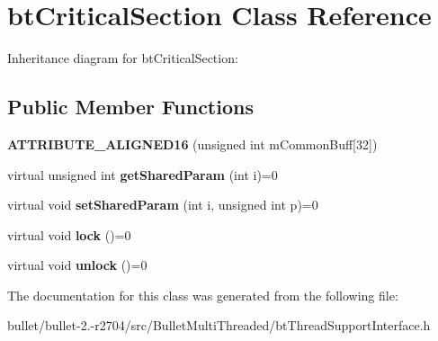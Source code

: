 \hypertarget{classbt_critical_section}{\section{bt\+Critical\+Section Class Reference}
\label{classbt_critical_section}
}


Inheritance diagram for bt\+Critical\+Section\+:
\subsection*{Public Member Functions}
\begin{DoxyCompactItemize}
\item 
\hypertarget{classbt_critical_section_aca4159904f35d55d54fed017a2d2dc0b}{{\bfseries A\+T\+T\+R\+I\+B\+U\+T\+E\+\_\+\+A\+L\+I\+G\+N\+E\+D16} (unsigned int m\+Common\+Buff\mbox{[}32\mbox{]})}\label{classbt_critical_section_aca4159904f35d55d54fed017a2d2dc0b}

\item 
\hypertarget{classbt_critical_section_ad58e34e3eb0fc636edeb69fe17f793ac}{virtual unsigned int {\bfseries get\+Shared\+Param} (int i)=0}\label{classbt_critical_section_ad58e34e3eb0fc636edeb69fe17f793ac}

\item 
\hypertarget{classbt_critical_section_a8f0f5d49aeddc47b168f2176d191b7fb}{virtual void {\bfseries set\+Shared\+Param} (int i, unsigned int p)=0}\label{classbt_critical_section_a8f0f5d49aeddc47b168f2176d191b7fb}

\item 
\hypertarget{classbt_critical_section_a272e306b93f74fe288da28b019446b03}{virtual void {\bfseries lock} ()=0}\label{classbt_critical_section_a272e306b93f74fe288da28b019446b03}

\item 
\hypertarget{classbt_critical_section_acdfd8149ad4e36ce7ac7d13b2b220f44}{virtual void {\bfseries unlock} ()=0}\label{classbt_critical_section_acdfd8149ad4e36ce7ac7d13b2b220f44}

\end{DoxyCompactItemize}


The documentation for this class was generated from the following file\+:\begin{DoxyCompactItemize}
\item 
bullet/bullet-\/2.-\/r2704/src/\+Bullet\+Multi\+Threaded/bt\+Thread\+Support\+Interface.\+h\end{DoxyCompactItemize}
